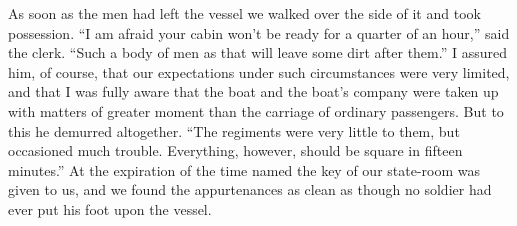 As soon as the men had left the vessel we walked over the side of
it and took possession.  ``I am afraid your cabin won't be ready for
a quarter of an hour,'' said the clerk.  ``Such a body of men as that
will leave some dirt after them.''  I assured him, of course, that
our expectations under such circumstances were very limited, and
that I was fully aware that the boat and the boat's company were
taken up with matters of greater moment than the carriage of
ordinary passengers.  But to this he demurred altogether.  ``The
regiments were very little to them, but occasioned much trouble.
Everything, however, should be square in fifteen minutes.''  At the
expiration of the time named the key of our state-room was given to
us, and we found the appurtenances as clean as though no soldier
had ever put his foot upon the vessel.

